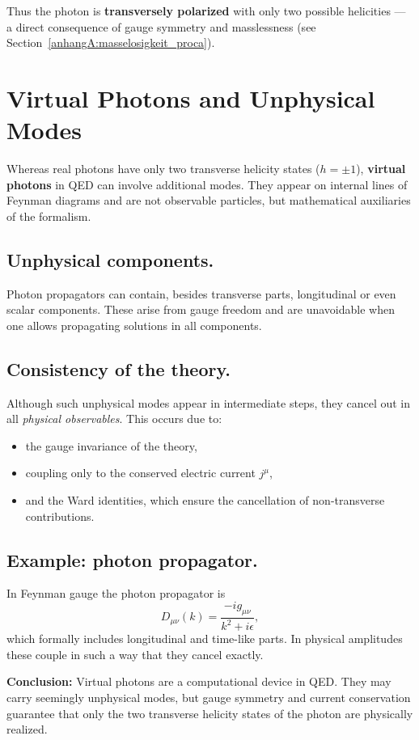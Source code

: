 \medskip
Thus the photon is \textbf{transversely polarized} with only two possible helicities —
a direct consequence of gauge symmetry and masslessness 
(see Section~\ref{anhangA:masselosigkeit_proca}).

\section{Virtual Photons and Unphysical \newline Modes}
\label{anhangA:virtuelle_moden}

Whereas real photons have only two transverse helicity states 
(\( h = \pm 1 \)), \textbf{virtual photons} in QED can involve additional modes. 
They appear on internal lines of Feynman diagrams and are not observable particles,
but mathematical auxiliaries of the formalism.

\subsection*{Unphysical components.}
Photon propagators can contain, besides transverse parts,
longitudinal or even scalar components.  
These arise from gauge freedom and are unavoidable when one allows propagating solutions in all components.

\subsection*{Consistency of the theory.}

Although such unphysical modes appear in intermediate steps,
they cancel out in all \emph{physical observables}.  
This occurs due to:
\begin{itemize}
	\item the gauge invariance of the theory,
	\item coupling only to the conserved electric current \( j^\mu \),
	\item and the Ward identities, which ensure the cancellation of non-transverse contributions.
\end{itemize}

\subsection*{Example: photon propagator.}
In Feynman gauge the photon propagator is
\[
D_{\mu\nu}(k) = \frac{-i g_{\mu\nu}}{k^2 + i\epsilon} ,
\]
which formally includes longitudinal and time-like parts.  
In physical amplitudes these couple in such a way that they cancel exactly.

\medskip
\textbf{Conclusion:}  
Virtual photons are a computational device in QED.  
They may carry seemingly unphysical modes, but gauge symmetry and current conservation 
guarantee that only the two transverse helicity states of the photon are physically realized.
